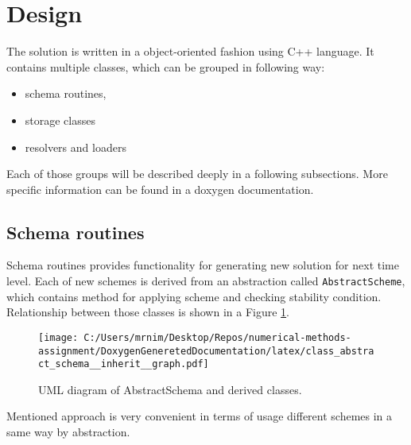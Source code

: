 \section{Design}
	The solution is written in a object-oriented fashion using C++ language. It contains multiple classes, which can be grouped in following way:
	\begin{itemize}
		\item schema routines,
		\item storage classes
		\item resolvers and loaders
	\end{itemize}
	Each of those groups will be described deeply in a following subsections. More specific information can be found in a doxygen documentation.
	
	\subsection{Schema routines}
		Schema routines provides functionality for generating new solution for next time level. Each of new schemes is derived from an abstraction called \texttt{AbstractScheme}, which contains method for applying scheme and checking stability condition. Relationship between those classes is shown in a Figure \ref{fig:abstractSchema}. 
		\begin{figure}[!hbtp]
			\centering
			\texttt{[image: C:/Users/mrnim/Desktop/Repos/numerical-methods-assignment/DoxygenGeneretedDocumentation/latex/class\_abstract\_schema\_\_inherit\_\_graph.pdf]}
			\caption{UML diagram of AbstractSchema and derived classes.}
			\label{fig:abstractSchema}
		\end{figure}
		Mentioned approach is very convenient in terms of usage different schemes in a same way by abstraction.
